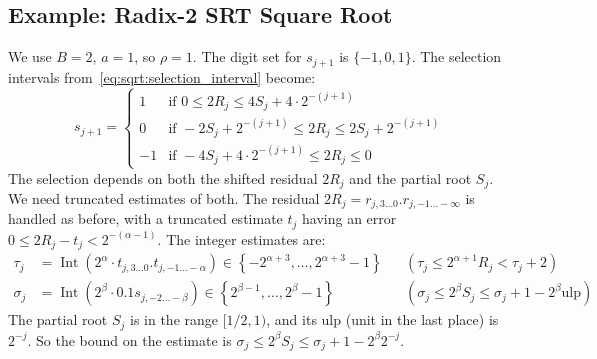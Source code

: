 \documentclass{article}
\DeclareMathOperator{\Int}{Int}
\begin{document}
\subsection{Example: Radix-2 SRT Square Root}
\label{ssec:sqrt:radix2}
We use $B = 2$, $a = 1$, so $\rho = 1$.
The digit set for $s_{j+1}$ is $\{-1, 0, 1\}$.
The selection intervals from~\cref{eq:sqrt:selection_interval} become:
\begin{equation}
  \label{eq:sqrt:radix2_intervals}
  s_{j+1} =
  \begin{cases}
    1  & \text{if } 0 \leq 2 R_j \leq 4 S_j + 4 \cdot 2^{-(j+1)} \\
    0  & \text{if } -2 S_j + 2^{-(j+1)} \leq 2 R_j \leq 2 S_j + 2^{-(j+1)} \\
    -1 & \text{if } -4 S_j + 4 \cdot 2^{-(j+1)} \leq 2 R_j \leq 0
  \end{cases}
\end{equation}
The selection depends on both the shifted residual $2R_j$ and the partial root $S_j$.
We need truncated estimates of both.
The residual $2 R_j = r_{j,3\ldots0}.r_{j,-1\ldots-\infty}$ is handled as before, with a truncated estimate $t_j$ having an error $0 \leq 2 R_j - t_j < 2^{-(\alpha-1)}$.
The integer estimates are:
\begin{align}
  \label{eq:sqrt:radix2_tau_def}
  \tau_j &= \Int(2^\alpha \cdot t_{j,3\ldots0}.t_{j,-1\ldots-\alpha}) \in \left\{-2^{\alpha+3}, \dots, 2^{\alpha+3}-1\right\} && (\tau_j \leq 2^{\alpha+1} R_j < \tau_j + 2) \\
  \label{eq:sqrt:radix2_sigma_def}
  \sigma_j &= \Int(2^\beta \cdot 0.1s_{j,-2\ldots-\beta}) \in \left\{2^{\beta-1}, \dots, 2^\beta-1\right\} && (\sigma_j \leq 2^\beta S_j \leq \sigma_j + 1 - 2^\beta \mathrm{ulp})
\end{align}
The partial root $S_j$ is in the range $[1/2, 1)$, and its ulp (unit in the last place) is $2^{-j}$.
So the bound on the estimate is $\sigma_j \leq 2^\beta S_j \leq \sigma_j + 1 - 2^\beta 2^{-j}$.
\end{document}
